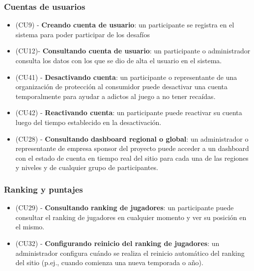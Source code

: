 \subsubsection{Cuentas de usuarios}
\begin{itemize}
\item (CU9) -  \textbf{Creando cuenta de usuario}: un participante se registra en el sistema para poder participar de los desafíos
\item (CU12)-  \textbf{Consultando cuenta de usuario}: un participante o administrador consulta los datos con los que se dio de alta el usuario en el sistema.
\item (CU41) - \textbf{Desactivando cuenta}: un participante o representante de una organización de protección al consumidor puede desactivar una cuenta temporalmente para ayudar a adictos al juego a no tener recaídas.
\item (CU42) - \textbf{Reactivando cuenta}: un participante puede reactivar su cuenta luego del tiempo establecido en la desactivación.
\item (CU28) -  \textbf{Consultando dashboard regional o global}: un administrador o representante de empresa sponsor del proyecto puede acceder a un dashboard con el estado de cuenta en tiempo real del sitio para cada una de las regiones y niveles y de cualquier grupo de participantes.
\end{itemize}

\subsubsection{Ranking y puntajes}

\begin{itemize}
\item (CU29) - \textbf{Consultando ranking de jugadores}: un participante puede consultar el ranking de jugadores en cualquier momento y ver su posición en el mismo.
\item (CU32) - \textbf{Configurando reinicio del ranking de jugadores}: un administrador configura cuándo se realiza el reinicio automático del ranking del sitio (p.ej., cuando comienza una nueva temporada o año).
\end{itemize}


